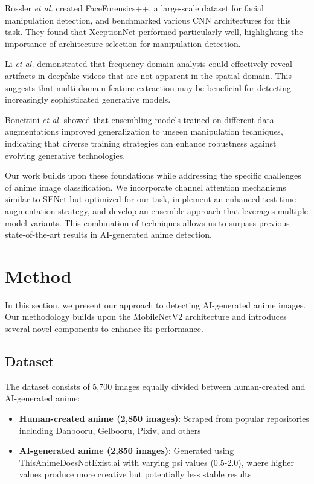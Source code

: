\documentclass{article}
\begin{document}
Rossler \textit{et al.} \cite{rossler2019faceforensics++} created FaceForensics++, a large-scale dataset for facial manipulation detection, and benchmarked various CNN architectures for this task. They found that XceptionNet performed particularly well, highlighting the importance of architecture selection for manipulation detection.

Li \textit{et al.} \cite{li2020face} demonstrated that frequency domain analysis could effectively reveal artifacts in deepfake videos that are not apparent in the spatial domain. This suggests that multi-domain feature extraction may be beneficial for detecting increasingly sophisticated generative models.

Bonettini \textit{et al.} \cite{bonettini2020video} showed that ensembling models trained on different data augmentations improved generalization to unseen manipulation techniques, indicating that diverse training strategies can enhance robustness against evolving generative technologies.

Our work builds upon these foundations while addressing the specific challenges of anime image classification. We incorporate channel attention mechanisms similar to SENet but optimized for our task, implement an enhanced test-time augmentation strategy, and develop an ensemble approach that leverages multiple model variants. This combination of techniques allows us to surpass previous state-of-the-art results in AI-generated anime detection.

\section{Method}

In this section, we present our approach to detecting AI-generated anime images. Our methodology builds upon the MobileNetV2 architecture and introduces several novel components to enhance its performance.

\subsection{Dataset}

The dataset consists of 5,700 images equally divided between human-created and AI-generated anime:

\begin{itemize}
    \item \textbf{Human-created anime (2,850 images)}: Scraped from popular repositories including Danbooru, Gelbooru, Pixiv, and others
    \item \textbf{AI-generated anime (2,850 images)}: Generated using ThisAnimeDoesNotExist.ai with varying psi values (0.5-2.0), where higher values produce more creative but potentially less stable results
\end{itemize}
\end{document}
